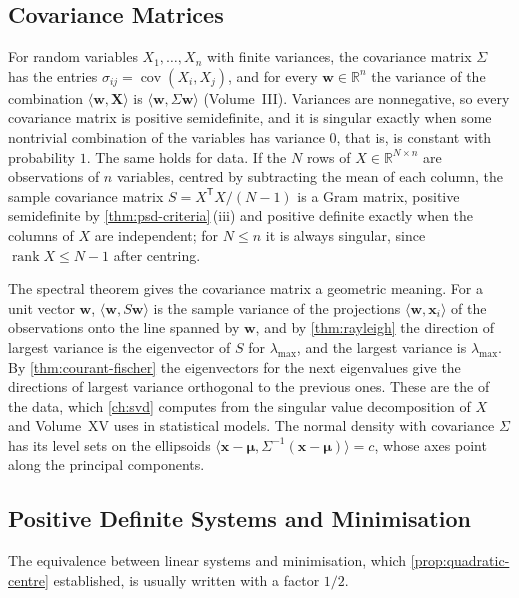 \subsection{Covariance Matrices}

For random variables $X_1,\ldots,X_n$ with finite variances, the covariance matrix $\Sigma$ has the entries $\sigma_{ij}=\operatorname{cov}(X_i,X_j)$, and for every $\mathbf w\in\mathbb R^n$ the variance of the combination $\langle\mathbf w,\mathbf X\rangle$ is $\langle\mathbf w,\Sigma\mathbf w\rangle$ (Volume~III). Variances are nonnegative, so every covariance matrix is positive semidefinite, and it is singular exactly when some nontrivial combination of the variables has variance $0$, that is, is constant with probability $1$. The same holds for data. If the $N$ rows of $X\in\mathbb R^{N\times n}$ are observations of $n$ variables, centred by subtracting the mean of each column, the sample covariance matrix $S=X^{\mathsf T}X/(N-1)$ is a Gram matrix, positive semidefinite by \cref{thm:psd-criteria}\,(iii) and positive definite exactly when the columns of $X$ are independent; for $N\le n$ it is always singular, since $\operatorname{rank}X\le N-1$ after centring.

The spectral theorem gives the covariance matrix a geometric meaning. For a unit vector $\mathbf w$, $\langle\mathbf w,S\mathbf w\rangle$ is the sample variance of the projections $\langle\mathbf w,\mathbf x_i\rangle$ of the observations onto the line spanned by $\mathbf w$, and by \cref{thm:rayleigh} the direction of largest variance is the eigenvector of $S$ for $\lambda_{\max}$, and the largest variance is $\lambda_{\max}$. By \cref{thm:courant-fischer} the eigenvectors for the next eigenvalues give the directions of largest variance orthogonal to the previous ones. These are the  of the data, which \cref{ch:svd} computes from the singular value decomposition of $X$ and Volume~XV uses in statistical models. The normal density with covariance $\Sigma$ has its level sets on the ellipsoids $\langle\mathbf x-\boldsymbol\mu,\Sigma^{-1}(\mathbf x-\boldsymbol\mu)\rangle=c$, whose axes point along the principal components.

\subsection{Positive Definite Systems and Minimisation}

The equivalence between linear systems and minimisation, which \cref{prop:quadratic-centre} established, is usually written with a factor $1/2$.

